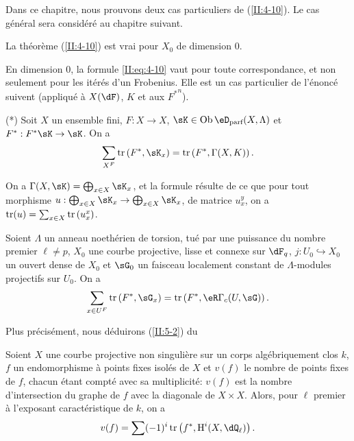Dans ce chapitre, nous prouvons deux cas particuliers de (\ref{II:4-10}). Le 
cas général sera considéré au chapitre suivant. 





\begin{lemma_}\label{II:5-1}
La théorème (\ref{II:4-10}) est vrai pour $X_0$ de dimension $0$. 
\end{lemma_}

En dimension $0$, la formule \eqref{II:eq:4-10} vaut pour toute 
correspondance, et non seulement pour les itérés d'un Frobenius. Elle est 
un cas particulier de l'énoncé suivent (appliqué à $X(\dF)$, $K$ et 
aux ${F^*}^n$). 

(*) Soit $X$ un ensemble fini, $F:X\to X$, $\sK\in\ob\eD_\text{parf}(X,\Lambda)$ 
et $F^*:F^* \sK\to \sK$. On a 
\[
  \sum_{X^F} \tr\left(F^*,\sK_x\right) = \tr\left(F^*,\Gamma(X,K)\right) \text{.}
\]

On a $\Gamma(X,\sK)=\bigoplus_{x\in X} \sK_x$, et la formule résulte de ce que 
pour tout morphisme $u:\bigoplus_{x\in X} \sK_x\to \bigoplus_{x\in X} \sK_x$, de 
matrice $u_x^y$, on a $\operatorname{tr}(u)=\sum_{x\in X} \operatorname{tr}\left(u_x^x\right)$. 





\begin{lemma_}\label{II:5-2}
Soient $\Lambda$ un anneau noethérien de torsion, tué par une puissance du 
nombre premier $\ell\ne p$, $X_0$ une courbe projective, lisse et connexe sur 
$\dF_q$, $j:U_0\hookrightarrow X_0$ un ouvert dense de $X_0$ et $\sG_0$ un 
faisceau localement constant de $\Lambda$-modules projectifs sur $U_0$. On a 
\[
  \sum_{x\in U^F} \tr\left(F^*,\sG_x\right) = \tr\left(F^*,\eR\Gamma_c(U,\sG)\right) \text{.}
\]
\end{lemma_}

Plus précisément, nous déduirons (\ref{II:5-2}) du 





\begin{theorem_}\label{II:5-3}
Soient $X$ une courbe projective non singulière sur un corps algébriquement 
clos $k$, $f$ un endomorphisme à points fixes isolés de $X$ et $v(f)$ le 
nombre de points fixes de $f$, chacun étant compté avec sa multiplicité: 
$v(f)$ est la nombre d'intersection du graphe de $f$ avec la diagonale de 
$X\times X$. Alors, pour $\ell$ premier à l'exposant caractéristique de $k$, 
on a 
\[
  v(f) = \sum (-1)^i \tr\left(f^*,\h^i(X,\dQ_\ell)\right) \text{.}
\]
\end{theorem_}

